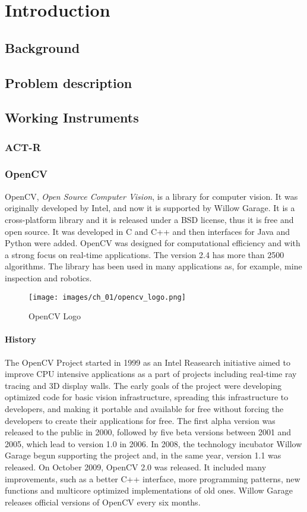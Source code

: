 \chapter{Introduction}
\section{Background}
\section{Problem description}
\section{Working Instruments}
\subsection{ACT-R}
\subsection{OpenCV}
	OpenCV, \emph{Open Source Computer Vision}, is a library for computer vision. It was originally developed by Intel, and now it is supported by Willow Garage.
	It is a cross-platform library and it is released under a BSD license, thus it is free and open source. It was developed in C and C++ and then interfaces for Java and Python were added. OpenCV was designed for computational efficiency and with a strong focus on real-time applications. The version 2.4 has more than 2500 algorithms. The library has been used in many applications as, for example, mine inspection and robotics.
	\begin{wrapfigure}{l}{0.2\textwidth}
  		\begin{center}
  	  	\texttt{[image: images/ch\_01/opencv\_logo.png]}
  		\end{center}
  		\caption{OpenCV Logo}
	\end{wrapfigure}		
	
	\subsubsection*{History}
	The OpenCV Project started in 1999 as an Intel Reasearch initiative aimed to improve CPU intensive applications as a part of projects including real-time ray tracing and 3D display walls. The early goals of the project were developing optimized code for basic vision infrastructure, spreading this infrastructure to developers, and making it portable and available for free without forcing the developers to create their applications for free.
	The first alpha version was released to the public in 2000, followed by five beta versions between 2001 and 2005, which lead to version 1.0 in 2006. In 2008, the technology incubator Willow Garage begun supporting the project and, in the same year, version 1.1  was released. 
	On October 2009, OpenCV 2.0 was released. It included many improvements, such as a better C++ interface, more programming patterns, new functions and multicore optimized implementations of old ones. Willow Garage releases official versions of OpenCV every six months.